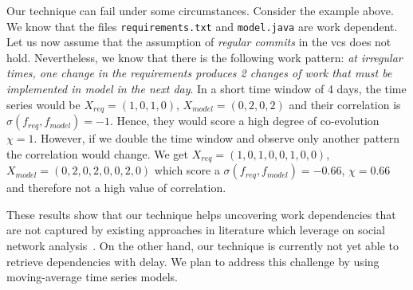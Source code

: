 Our technique can fail under some circumstances. Consider the example above. We know that the files \texttt{requirements.txt} and \texttt{model.java} are work dependent. Let us now assume that the assumption of \emph{regular commits} in the \gls{vcs} does not hold. Nevertheless, we know that there is the following work pattern: \emph{at irregular times, one change in the requirements produces 2 changes of work that must be implemented in model in the next day}. In a short time window of 4 days, the time series would be $X_{req} = (1,0,1,0)$, $X_{model} = (0,2,0,2)$ and their correlation is $\sigma(f_{req},f_{model}) = -1$. Hence, they would score a high degree of co-evolution $\chi=1$. However, if we double the time window  and observe only another pattern the correlation would change. We get $X_{req} = (1,0,1,0,0,1,0,0)$, $X_{model} = (0,2,0,2,0,0,2,0)$ which score a $\sigma(f_{req},f_{model}) = -0.66$, $\chi=0.66$ and therefore not a high value of correlation.

These results show that our technique helps uncovering work dependencies that are not captured by existing approaches in literature which leverage on social network analysis~\citep{Zimmermann2008,Weicheng2013}. On the other hand, our technique is currently not yet able to retrieve dependencies with delay. We plan to address this challenge by using moving-average time series models. 